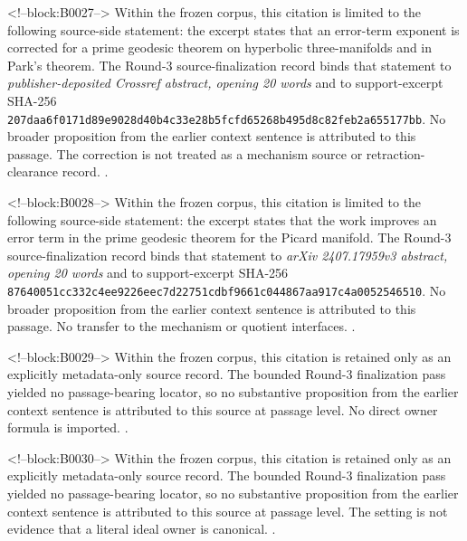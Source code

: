 \documentclass[11pt,a4paper]{article}
\begin{document}
<!--block:B0027-->
Within the frozen corpus, this citation is limited to the following source-side statement: the excerpt states that an error-term exponent is corrected for a prime geodesic theorem on hyperbolic three-manifolds and in Park's theorem. The Round-3 source-finalization record binds that statement to \emph{publisher-deposited Crossref abstract, opening 20 words} and to support-excerpt SHA-256 \texttt{207daa6f\allowbreak{}0171d89e\allowbreak{}9028d40b\allowbreak{}4c33e28b\allowbreak{}5fcfd652\allowbreak{}68b495d8\allowbreak{}c82feb2a\allowbreak{}655177bb}. No broader proposition from the earlier context sentence is attributed to this passage. The correction is not treated as a mechanism source or retraction-clearance record.
\citep{P29-S07}.

<!--block:B0028-->
Within the frozen corpus, this citation is limited to the following source-side statement: the excerpt states that the work improves an error term in the prime geodesic theorem for the Picard manifold. The Round-3 source-finalization record binds that statement to \emph{arXiv 2407.17959v3 abstract, opening 20 words} and to support-excerpt SHA-256 \texttt{87640051\allowbreak{}cc332c4e\allowbreak{}e9226eec\allowbreak{}7d22751c\allowbreak{}dbf9661c\allowbreak{}044867aa\allowbreak{}917c4a00\allowbreak{}52546510}. No broader proposition from the earlier context sentence is attributed to this passage. No transfer to the mechanism or quotient interfaces.
\citep{P29-S09}.

<!--block:B0029-->
Within the frozen corpus, this citation is retained only as an explicitly metadata-only source record. The bounded Round-3 finalization pass yielded no passage-bearing locator, so no substantive proposition from the earlier context sentence is attributed to this source at passage level. No direct owner formula is imported.
\citep{P29-S17}.

<!--block:B0030-->
Within the frozen corpus, this citation is retained only as an explicitly metadata-only source record. The bounded Round-3 finalization pass yielded no passage-bearing locator, so no substantive proposition from the earlier context sentence is attributed to this source at passage level. The setting is not evidence that a literal ideal owner is canonical.
\citep{P29-S18}.
\end{document}
